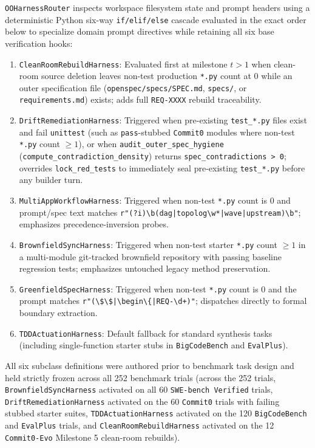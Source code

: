 \documentclass[11pt,a4paper,copyright]{google}
\begin{document}
\begin{enumerate}[leftmargin=1.5em,itemsep=3pt,topsep=3pt]
\begin{itemize}[leftmargin=1.5em,itemsep=1pt,topsep=1pt]
  \end{itemize}
  \texttt{OOHarnessRouter} inspects workspace filesystem state and prompt headers using a deterministic Python six-way \texttt{if/elif/else} cascade evaluated in the exact order below to specialize domain prompt directives while retaining all six base verification hooks:
  \begin{enumerate}[leftmargin=1.5em,itemsep=1pt,topsep=1pt]
    \item \texttt{CleanRoomRebuildHarness}: Evaluated first at milestone $t > 1$ when clean-room source deletion leaves non-test production \texttt{*.py} count at $0$ while an outer specification file (\texttt{openspec/specs/SPEC.md}, \texttt{specs/}, or \texttt{requirements.md}) exists; adds full \texttt{REQ-XXXX} rebuild traceability.
    \item \texttt{DriftRemediationHarness}: Triggered when pre-existing \texttt{test\_*.py} files exist and fail \texttt{unittest} (such as \texttt{pass}-stubbed \texttt{Commit0} modules where non-test \texttt{*.py} count $\ge 1$), or when \texttt{audit\_outer\_spec\_hygiene} (\texttt{compute\_contradiction\_density}) returns \texttt{spec\_contradictions > 0}; overrides \texttt{lock\_red\_tests} to immediately seal pre-existing \texttt{test\_*.py} before any builder turn.
    \item \texttt{MultiAppWorkflowHarness}: Triggered when non-test \texttt{*.py} count is $0$ and prompt/spec text matches \texttt{r"(?i)\textbackslash b(dag|\allowbreak topolog\textbackslash w*|\allowbreak wave|\allowbreak upstream)\textbackslash b"}; emphasizes precedence-inversion probes.
    \item \texttt{BrownfieldSyncHarness}: Triggered when non-test starter \texttt{*.py} count $\ge 1$ in a multi-module git-tracked brownfield repository with passing baseline regression tests; emphasizes untouched legacy method preservation.
    \item \texttt{GreenfieldSpecHarness}: Triggered when non-test \texttt{*.py} count is $0$ and the prompt matches \texttt{r"(\textbackslash\$\textbackslash\$|\textbackslash begin\textbackslash\{|REQ-\textbackslash d+)"}; dispatches directly to formal boundary extraction.
    \item \texttt{TDDActuationHarness}: Default fallback for standard synthesis tasks (including single-function starter stubs in \texttt{BigCodeBench} and \texttt{EvalPlus}).
  \end{enumerate}
  All six subclass definitions were authored prior to benchmark task design and held strictly frozen across all 252 benchmark trials (across the 252 trials, \texttt{BrownfieldSyncHarness} activated on all 60 \texttt{SWE-bench Verified} trials, \texttt{DriftRemediationHarness} activated on the 60 \texttt{Commit0} trials with failing stubbed starter suites, \texttt{TDDActuationHarness} activated on the 120 \texttt{BigCodeBench} and \texttt{EvalPlus} trials, and \texttt{CleanRoomRebuildHarness} activated on the 12 \texttt{Commit0-Evo} Milestone 5 clean-room rebuilds).

\end{enumerate}
\end{document}
